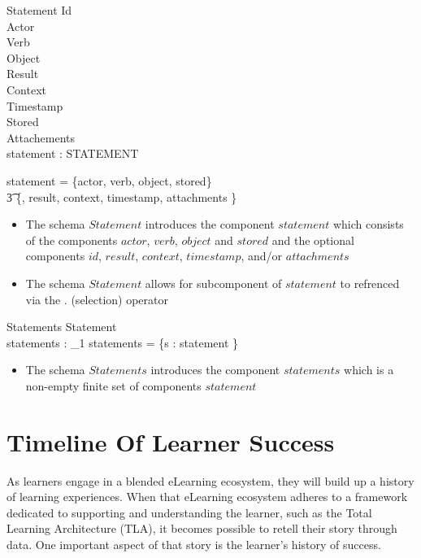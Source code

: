 \documentclass{article}
\begin{document}
\begin{schema}{Statement}
  Id \\
  Actor \\
  Verb \\
  Object \\
  Result \\
  Context \\
  Timestamp \\
  Stored \\
  Attachements \\
  statement : STATEMENT

  \where
  statement = \{actor, verb, object, stored\} \cup \\\t3 \power \{\id,
  result, context, timestamp, attachments \} \\
\end{schema}
\begin{itemize}
\item The schema $Statement$ introduces the component $statement$
  which consists of the components $actor$, $verb$, $object$ and
  $stored$ and the optional components $id$, $result$, $context$,
  $timestamp$, and/or $attachments$
\item The schema $Statement$ allows for subcomponent of $statement$
  to refrenced via the $.$ (selection) operator
\end{itemize}

\begin{schema}{Statements}
  Statement \\
  statements : \finset_1
  \where
  statements = \{s : statement \}
\end{schema}
\begin{itemize}
\item The schema $Statements$ introduces the component $statements$
  which is a non-empty finite set of components $statement$
\end{itemize}

\section{Timeline Of Learner Success}
As learners engage in a blended eLearning ecosystem, they will build
up a history of learning experiences. When that eLearning ecosystem
adheres to a framework dedicated to supporting and understanding the
learner, such as the Total Learning Architecture (TLA), it becomes
possible to retell their story through data. One important aspect of
that story is the learner's history of success.
\end{document}
